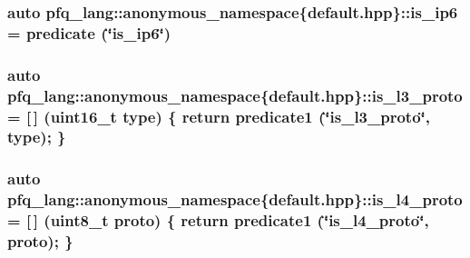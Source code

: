 \hypertarget{namespacepfq__lang_1_1anonymous__namespace_02default_8hpp_03_a107437a3539c86e92035db62e88b7d81}{
\subsubsection[{is\-\_\-ip6}]{\setlength{\rightskip}{0pt plus 5cm}auto pfq\-\_\-lang\-::anonymous\-\_\-namespace\{default.\-hpp\}\-::is\-\_\-ip6 = {\bf predicate} (\char`\"{}is\-\_\-ip6\char`\"{})}}\label{namespacepfq__lang_1_1anonymous__namespace_02default_8hpp_03_a107437a3539c86e92035db62e88b7d81}
\hypertarget{namespacepfq__lang_1_1anonymous__namespace_02default_8hpp_03_aa447a7b5765c5c5f9036de8358f86434}{
\subsubsection[{is\-\_\-l3\-\_\-proto}]{\setlength{\rightskip}{0pt plus 5cm}auto pfq\-\_\-lang\-::anonymous\-\_\-namespace\{default.\-hpp\}\-::is\-\_\-l3\-\_\-proto = \mbox{[}$\,$\mbox{]} (uint16\-\_\-t type) \{ return {\bf predicate1} (\char`\"{}is\-\_\-l3\-\_\-proto\char`\"{}, type); \}}}\label{namespacepfq__lang_1_1anonymous__namespace_02default_8hpp_03_aa447a7b5765c5c5f9036de8358f86434}
\hypertarget{namespacepfq__lang_1_1anonymous__namespace_02default_8hpp_03_ac2363f68f819b20eb7afc4acdcdd0bf0}{
\subsubsection[{is\-\_\-l4\-\_\-proto}]{\setlength{\rightskip}{0pt plus 5cm}auto pfq\-\_\-lang\-::anonymous\-\_\-namespace\{default.\-hpp\}\-::is\-\_\-l4\-\_\-proto = \mbox{[}$\,$\mbox{]} (uint8\-\_\-t proto) \{ return {\bf predicate1} (\char`\"{}is\-\_\-l4\-\_\-proto\char`\"{}, proto); \}}}\label{namespacepfq__lang_1_1anonymous__namespace_02default_8hpp_03_ac2363f68f819b20eb7afc4acdcdd0bf0}
